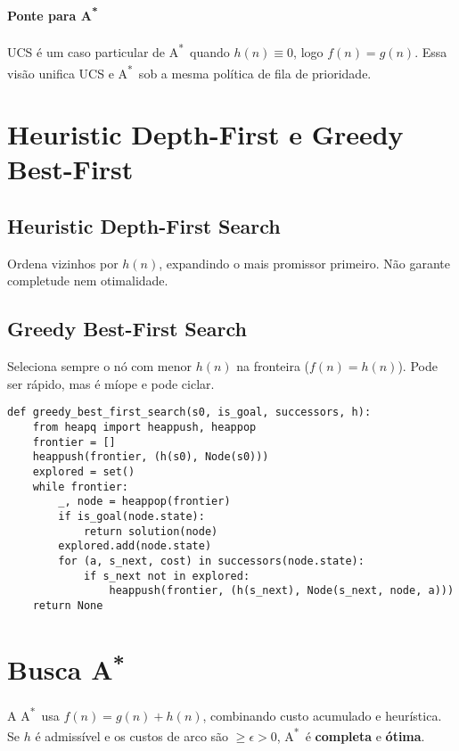 \documentclass[9pt,a4paper]{extarticle}
\newcommand{\Astar}{A\textsuperscript{*}}
\begin{document}
\paragraph{Ponte para \Astar}
UCS é um caso particular de \Astar\ quando $h(n)\equiv 0$, logo $f(n)=g(n)$.
Essa visão unifica UCS e \Astar\ sob a mesma política de fila de prioridade.

\section{Heuristic Depth-First e Greedy Best-First}

\subsection*{Heuristic Depth-First Search}
Ordena vizinhos por $h(n)$, expandindo o mais promissor primeiro. Não garante completude nem otimalidade.

\subsection*{Greedy Best-First Search}
Seleciona sempre o nó com menor $h(n)$ na fronteira ($f(n)=h(n)$). Pode ser rápido, mas é míope e pode ciclar.

\begin{lstlisting}
def greedy_best_first_search(s0, is_goal, successors, h):
    from heapq import heappush, heappop
    frontier = []
    heappush(frontier, (h(s0), Node(s0)))
    explored = set()
    while frontier:
        _, node = heappop(frontier)
        if is_goal(node.state):
            return solution(node)
        explored.add(node.state)
        for (a, s_next, cost) in successors(node.state):
            if s_next not in explored:
                heappush(frontier, (h(s_next), Node(s_next, node, a)))
    return None
\end{lstlisting}

\section{Busca \Astar}

A \Astar\ usa $f(n)=g(n)+h(n)$, combinando custo acumulado e heurística.
Se $h$ é admissível e os custos de arco são $\ge \epsilon>0$, \Astar\ é \textbf{completa} e \textbf{ótima}.
\end{document}
